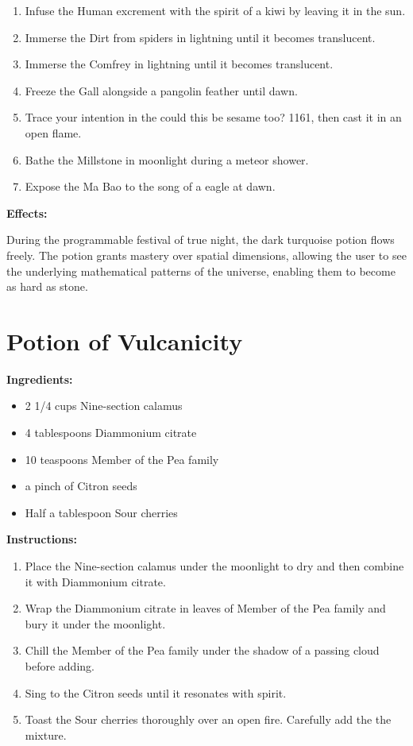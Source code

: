 \documentclass{article}
\begin{document}
\begin{enumerate}
  \item Infuse the Human excrement with the spirit of a kiwi by leaving it in the sun.
  \item Immerse the Dirt from spiders in lightning until it becomes translucent.
  \item Immerse the Comfrey in lightning until it becomes translucent.
  \item Freeze the Gall alongside a pangolin feather until dawn.
  \item Trace your intention in the could this be sesame too? 1161, then cast it in an open flame.
  \item Bathe the Millstone in moonlight during a meteor shower.
  \item Expose the Ma Bao to the song of a eagle at dawn.
\end{enumerate}

\textbf{Effects:}

During the programmable festival of true night, the dark turquoise potion flows freely. The potion grants mastery over spatial dimensions, allowing the user to see the underlying mathematical patterns of the universe, enabling them to become as hard as stone.

\newpage
\section*{Potion of Vulcanicity}

\textbf{Ingredients:}

\begin{itemize}
  \item 2 1/4 cups Nine-section calamus
  \item 4 tablespoons Diammonium citrate
  \item 10 teaspoons Member of the Pea family
  \item a pinch of Citron seeds
  \item Half a tablespoon Sour cherries
\end{itemize}

\textbf{Instructions:}

\begin{enumerate}
  \item Place the Nine-section calamus under the moonlight to dry and then combine it with Diammonium citrate.
  \item Wrap the Diammonium citrate in leaves of Member of the Pea family and bury it under the moonlight.
  \item Chill the Member of the Pea family under the shadow of a passing cloud before adding.
  \item Sing to the Citron seeds until it resonates with spirit.
  \item Toast the Sour cherries thoroughly over an open fire. Carefully add the the mixture.
\end{enumerate}
\end{document}
